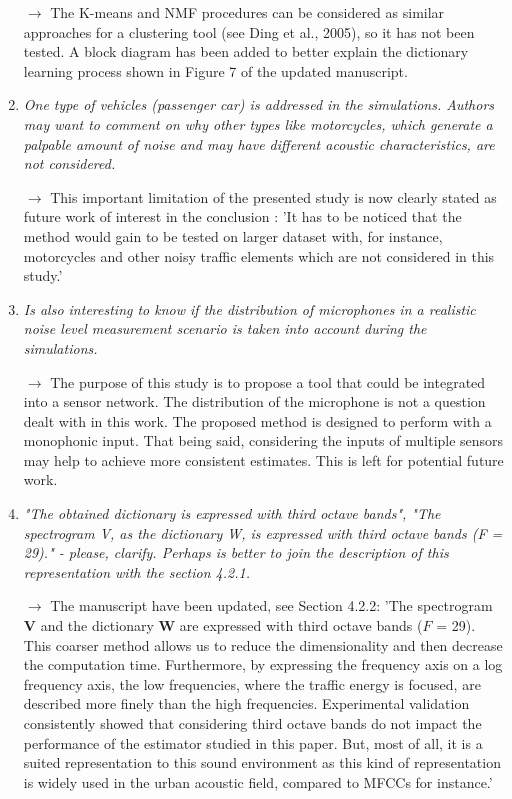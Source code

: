 \documentclass[10pt]{article}
\begin{document}
\begin{enumerate}
$\rightarrow$ The K-means and NMF procedures can be considered as similar approaches for a clustering tool (see Ding et al., 2005), so it has not been tested.
A block diagram has been added to better explain the dictionary learning process shown in Figure 7 of the updated manuscript.


\item \emph{One type of vehicles (passenger car) is addressed in the simulations. Authors may want to comment on why other types like motorcycles, which generate a palpable amount of noise and may have different acoustic characteristics, are not considered.}

$\rightarrow$ This important limitation of the presented study is now clearly stated as future work of interest in the conclusion : 'It has to be noticed that the method would gain to be tested on larger dataset with, for instance, motorcycles and other noisy traffic elements which are not considered in this study.'

\item \emph{Is also interesting to know if the distribution of microphones in a realistic noise level measurement scenario is taken into account during the simulations.}

$\rightarrow$ The purpose of this study is to propose a tool that could be integrated into a sensor network. The distribution of the microphone is not a question dealt with in this work. The proposed method is designed to perform with a monophonic input. That being said, considering the inputs of multiple sensors may help to achieve more consistent estimates. This is left for potential future work.

\item \emph{"The obtained dictionary is expressed with third octave bands", "The spectrogram V, as the dictionary W, is expressed with third octave bands (F = 29)." - please, clarify. Perhaps is better to join the description of this representation with the section 4.2.1.}

$\rightarrow$ The manuscript have been updated, see Section 4.2.2: 'The spectrogram $\mathbf{V}$ and the dictionary $\mathbf{W}$ are expressed with third octave bands ($F$ = 29). This coarser method allows us to reduce the dimensionality and then decrease the computation time. Furthermore, by expressing the frequency axis on a log frequency axis, the low frequencies, where the traffic energy is focused, are described more finely than the high frequencies. Experimental validation consistently showed that considering third octave bands do not impact the performance of the estimator studied in this paper. But, most of all, it is a suited representation to this sound environment as this kind of representation is widely used in the urban acoustic field, compared to MFCCs for instance.'


\end{enumerate}
\end{document}
